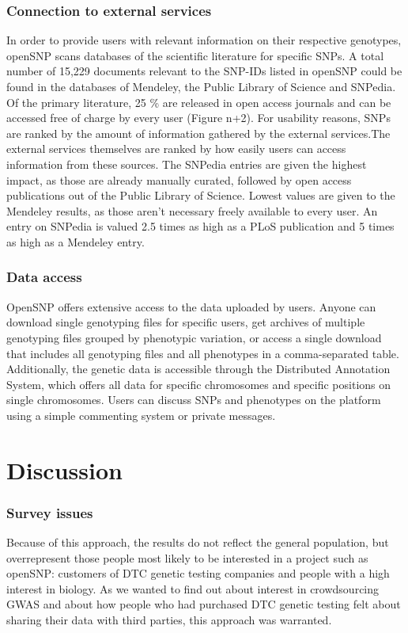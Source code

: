 \documentclass[10pt]{article}
\begin{document}
\subsubsection*{Connection to external services}
In order to provide users with relevant information on their respective genotypes, openSNP scans databases of the scientific literature for specific SNPs. A total number of 15,229 documents relevant to the SNP-IDs listed in openSNP could be found in the databases of Mendeley, the Public Library of Science and SNPedia. Of the primary literature, 25 \% are released in open access journals and can be accessed free of charge by every user (Figure n+2). For usability reasons, SNPs are ranked by the amount of information gathered by the external services.The external services themselves are ranked by how easily users can access information from these sources. The SNPedia entries are given the highest impact, as those are already manually curated, followed by open access publications out of the Public Library of Science. Lowest values are given to the Mendeley results, as those aren't necessary freely available to every user. An entry on SNPedia is valued 2.5 times as high as a PLoS publication and 5 times as high as a Mendeley entry.  
\subsubsection*{Data access}
OpenSNP offers extensive access to the data uploaded by users. Anyone can download single genotyping files for specific users, get archives of multiple genotyping files grouped by phenotypic variation, or access a single download that includes all genotyping files and all phenotypes in a comma-separated table. Additionally, the genetic data is accessible through the Distributed Annotation System, which offers all data for specific chromosomes and specific positions on single chromosomes. Users can discuss SNPs and phenotypes on the platform using a simple commenting system or private messages. 


\section*{Discussion}

\subsubsection*{Survey issues}
Because of this approach, the results do not reflect the general population, but overrepresent those people most likely to be interested in a project such as openSNP: customers of DTC genetic testing companies and people with a high interest in biology. As we wanted to find out about interest in crowdsourcing GWAS and about how people who had purchased DTC genetic testing felt about sharing their data with third parties, this approach was warranted.
\end{document}
